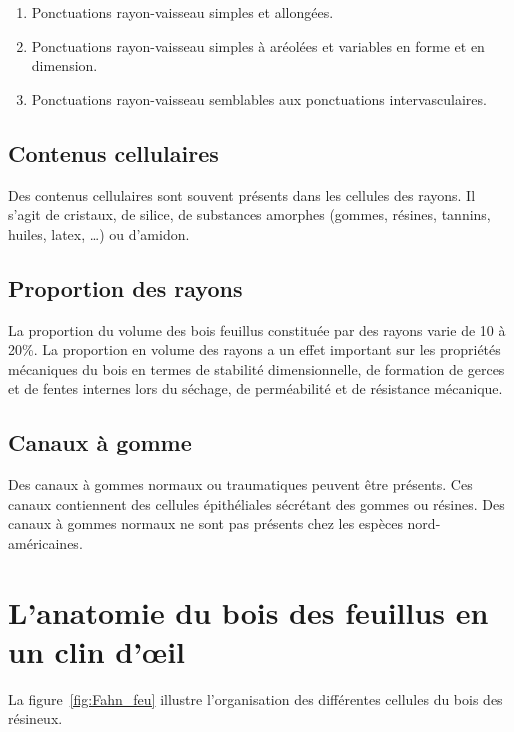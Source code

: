 \begin{enumerate}
\item Ponctuations rayon-vaisseau simples et allongées.
\item Ponctuations rayon-vaisseau simples à aréolées et variables en forme et en dimension.
\item Ponctuations rayon-vaisseau semblables aux ponctuations intervasculaires.
\end{enumerate}

\subsection{Contenus cellulaires}

Des contenus cellulaires sont souvent présents dans les cellules des rayons.  Il s'agit de cristaux, de silice, de substances amorphes (gommes, résines, tannins, huiles, latex, \ldots) ou d'amidon.

\subsection{Proportion des rayons}

La proportion du volume des bois feuillus constituée par des rayons varie de 10 à 20\%. La proportion en volume des rayons a un effet important sur les propriétés mécaniques du bois en termes de stabilité dimensionnelle, de formation de gerces et de fentes internes lors du séchage, de perméabilité et de résistance mécanique.

\subsection{Canaux à gomme}

Des canaux à gommes normaux ou traumatiques peuvent être présents. Ces canaux contiennent des cellules épithéliales sécrétant des gommes ou résines. Des canaux à gommes \og normaux \fg ne sont pas présents chez les espèces nord-américaines.

\section{L'anatomie du bois des feuillus en un clin d'œil}

La figure~\ref{fig:Fahn_feu} illustre l'organisation des différentes cellules du bois des résineux.

